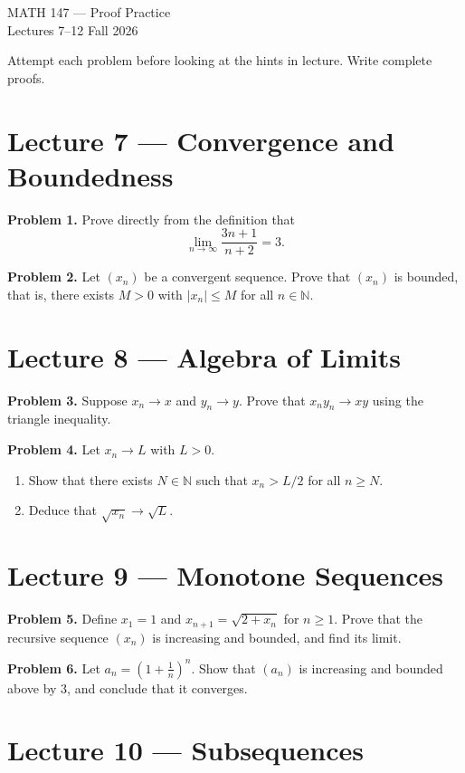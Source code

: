 \documentclass[11pt]{article}
\begin{document}
\begin{center}
{\Large MATH 147 --- Proof Practice}\\[2pt]
Lectures 7--12 \quad Fall 2026
\end{center}

\noindent Attempt each problem before looking at the hints in lecture. Write complete proofs.

\section*{Lecture 7 --- Convergence and Boundedness}

\noindent\textbf{Problem 1.} Prove directly from the definition that
\[
  \lim_{n\to\infty} \frac{3n+1}{n+2} = 3.
\]

\noindent\textbf{Problem 2.} Let $(x_n)$ be a convergent sequence. Prove that $(x_n)$ is bounded, that is, there exists $M > 0$ with $|x_n| \le M$ for all $n \in \mathbb{N}$.

\section*{Lecture 8 --- Algebra of Limits}

\noindent\textbf{Problem 3.} Suppose $x_n \to x$ and $y_n \to y$. Prove that $x_n y_n \to xy$ using the triangle inequality.

\noindent\textbf{Problem 4.} Let $x_n \to L$ with $L > 0$.
\begin{enumerate}[label=(\alph*)]
  \item Show that there exists $N \in \mathbb{N}$ such that $x_n > L/2$ for all $n \ge N$.
  \item Deduce that $\sqrt{x_n} \to \sqrt{L}$.
\end{enumerate}

\section*{Lecture 9 --- Monotone Sequences}

\noindent\textbf{Problem 5.} Define $x_1 = 1$ and $x_{n+1} = \sqrt{2 + x_n}$ for $n \ge 1$. Prove that the recursive sequence $(x_n)$ is increasing and bounded, and find its limit.

\noindent\textbf{Problem 6.} Let $a_n = \left(1 + \frac{1}{n}\right)^n$. Show that $(a_n)$ is increasing and bounded above by $3$, and conclude that it converges.

\section*{Lecture 10 --- Subsequences}
\end{document}
